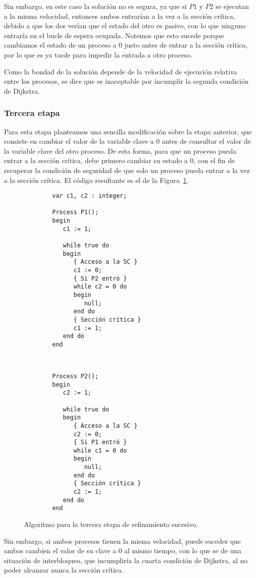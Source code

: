 Sin embargo, en este caso la solución no es segura, ya que si $P1$ y $P2$ se ejecutan a la misma velocidad, entonces ambos entrarían a la vez a la sección crítica, debido a que los dos verían que el estado del otro es pasivo, con lo que ninguno entraría en el bucle de espera ocupada. Notemos que esto sucede porque cambiamos el estado de un proceso a 0 justo antes de entrar a la sección crítica, por lo que es ya tarde para impedir la entrada a otro proceso.

Como la bondad de la solución depende de la velocidad de ejecución relativa entre los procesos, se dice que es inaceptable por incumplir la segunda condición de Dijkstra.

\subsubsection{Tercera etapa}
Para esta etapa planteamos una sencilla modificación sobre la etapa anterior, que consiste en cambiar el valor de la variable clave a 0 antes de consultar el valor de la variable clave del otro proceso. De esta forma, para que un proceso pueda entrar a la sección crítica, debe primero cambiar su estado a 0, con el fin de recuperar la condición de seguridad de que solo un proceso pueda entrar a la vez a la sección crítica. El código resultante es el de la Figura~\ref{fig:cod_tercera_etapa}.\\
\begin{figure}
\setlength{\columnsep}{1cm}
\begin{multicols}{2}
    \begin{verbatim}
        var c1, c2 : integer;
    
        Process P1();
        begin
           c1 := 1;
    
           while true do
           begin
              { Acceso a la SC }
              c1 := 0;
              { Si P2 entró }
              while c2 = 0 do
              begin
                 null;
              end do
              { Sección crítica }
              c1 := 1;
           end do
        end
    \end{verbatim}
    \begin{verbatim}

    
        Process P2();
        begin
           c2 := 1;
    
           while true do
           begin
              { Acceso a la SC }
              c2 := 0;
              { Si P1 entró }
              while c1 = 0 do
              begin
                 null;
              end do
              { Sección crítica }
              c2 := 1;
           end do
        end
    \end{verbatim}
\end{multicols}
\caption{Algoritmo para la tercera etapa de refinamiento sucesivo.}
\label{fig:cod_tercera_etapa}
\end{figure}
Sin embargo, si ambos procesos tienen la misma velocidad, puede suceder que ambos cambien el valor de su clave a 0 al mismo tiempo, con lo que se de una situación de interbloqueo, que incumpliría la cuarta condición de Dijkstra, al no poder alcanzar nunca la sección crítica.

